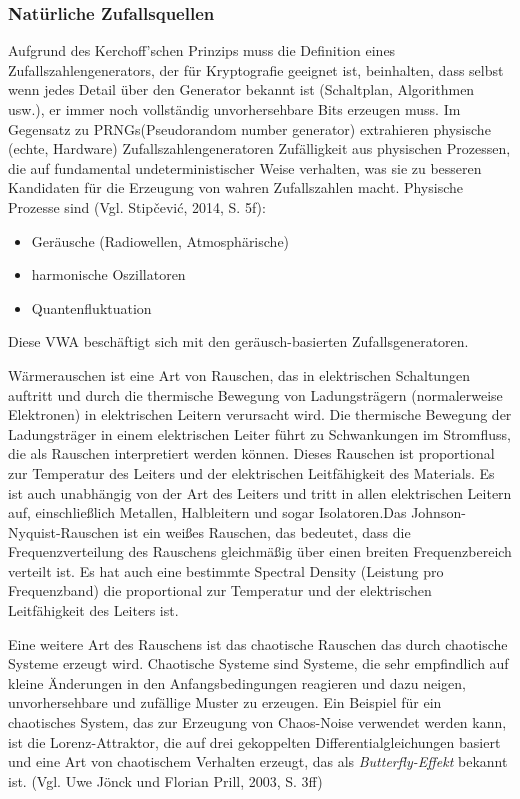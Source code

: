 \subsubsection{Natürliche Zufallsquellen}
Aufgrund des Kerchoff'schen Prinzips muss die Definition eines Zufallszahlengenerators, der für Kryptografie geeignet ist, beinhalten, 
dass selbst wenn jedes Detail über den Generator bekannt ist (Schaltplan, Algorithmen usw.), er immer noch vollständig unvorhersehbare 
Bits erzeugen muss. Im Gegensatz zu PRNGs(Pseudorandom number generator) extrahieren physische (echte, Hardware) Zufallszahlengeneratoren 
Zufälligkeit aus physischen Prozessen, die auf fundamental undeterministischer Weise verhalten, was sie zu besseren Kandidaten für die 
Erzeugung von wahren Zufallszahlen macht. Physische Prozesse sind (Vgl. Stipčević, 2014, S. 5f):
\begin{itemize}
    \item Geräusche (Radiowellen, Atmosphärische)
    \item harmonische Oszillatoren
    \item Quantenfluktuation
  \end{itemize}
Diese VWA beschäftigt sich mit den geräusch-basierten Zufallsgeneratoren.

Wärmerauschen ist eine Art von Rauschen, das in elektrischen Schaltungen auftritt und durch die thermische Bewegung von Ladungsträgern
(normalerweise Elektronen) in elektrischen Leitern verursacht wird. Die thermische Bewegung der Ladungsträger in einem elektrischen Leiter führt 
zu Schwankungen im Stromfluss, die als Rauschen interpretiert werden können. Dieses Rauschen ist proportional zur Temperatur des Leiters und der 
elektrischen Leitfähigkeit des Materials. Es ist auch unabhängig von der Art des Leiters und tritt in allen elektrischen Leitern auf, 
einschließlich Metallen, Halbleitern und sogar Isolatoren.Das Johnson-Nyquist-Rauschen ist ein weißes Rauschen, das bedeutet, dass die 
Frequenzverteilung des Rauschens gleichmäßig über einen breiten Frequenzbereich verteilt ist. Es hat auch eine bestimmte Spectral Density 
(Leistung pro Frequenzband) die proportional zur Temperatur und der elektrischen Leitfähigkeit des Leiters ist.

Eine weitere Art des Rauschens ist das chaotische Rauschen das durch chaotische Systeme erzeugt wird. Chaotische Systeme sind Systeme, die sehr 
empfindlich auf kleine Änderungen in den Anfangsbedingungen reagieren und dazu neigen, unvorhersehbare und zufällige Muster zu erzeugen. Ein Beispiel 
für ein chaotisches System, das zur Erzeugung von Chaos-Noise verwendet werden kann, ist die Lorenz-Attraktor, die auf drei gekoppelten 
Differentialgleichungen basiert und eine Art von chaotischem Verhalten erzeugt, das als \emph{Butterfly-Effekt} bekannt ist. (Vgl. Uwe Jönck und Florian Prill, 2003, S. 3ff)

